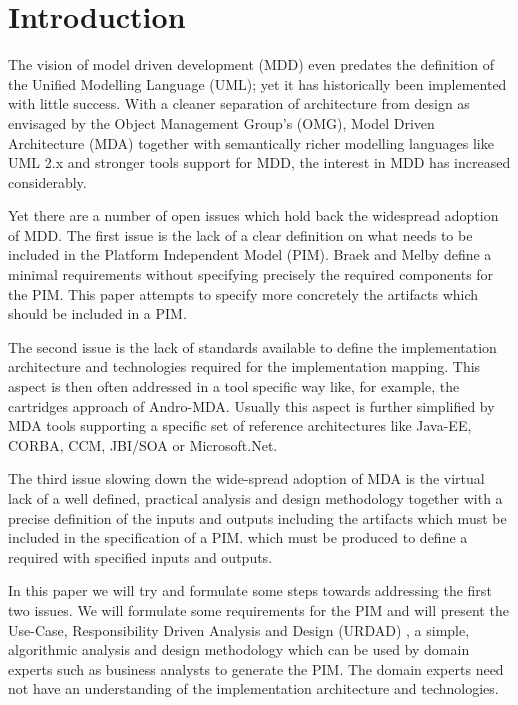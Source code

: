 \section{Introduction}

The vision of model driven development (MDD)
\cite{schmidt:modelDrivenEngineering,stahl:mdsd}
even predates the definition of the Unified Modelling Language (UML); yet it
has historically been implemented with little success. With a cleaner separation of
architecture from design as envisaged by the Object Management Group's (OMG),
Model Driven Architecture (MDA) \cite{siegel:developingInMDA,frankel:enterpriseMDA}
together with semantically richer modelling languages like UML 2.x and stronger
tools support for MDD, the interest in MDD has increased considerably.

Yet there are a number of open issues which hold back the widespread adoption of MDD.
The first issue is the lack of a clear definition on what needs to be included in the
Platform Independent Model (PIM). Braek and Melby \cite{braek:modelDrivenServiceEngineering}
define a minimal requirements without specifying precisely the required components
for the PIM. This paper attempts to specify more concretely the artifacts which should
be included in a PIM.

The second issue is the lack of standards available to define the implementation architecture
and technologies required for the implementation mapping. This aspect is then often addressed in
a tool specific way like, for example, the cartridges approach of Andro-MDA. Usually this aspect
is further simplified by MDA tools supporting a specific set of reference architectures like
Java-EE, CORBA, CCM, JBI/SOA or Microsoft.Net.

The third issue slowing down the wide-spread adoption of MDA is the virtual lack of
a well defined, practical analysis and design methodology together with a
precise definition of the inputs and outputs
including the artifacts which must be included in the specification of a PIM.
which must be produced to define a required with specified inputs and outputs.

In this paper we will try and formulate some steps towards addressing the first
two issues. We will formulate some requirements for the PIM and will present
the Use-Case, Responsibility Driven Analysis and Design (URDAD)
\cite{solms:urdad}, a simple, algorithmic analysis and design methodology
which can be used by domain experts such as business analysts to generate the
PIM. The domain experts need not have an understanding of the implementation
architecture and technologies.

